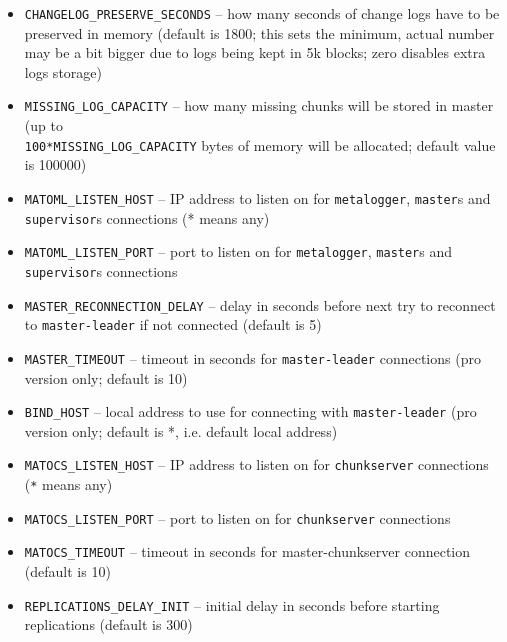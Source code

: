 \documentclass[a4paper,11pt,english]{report}
\def\code#1{\texttt{#1}}
\begin{document}
\begin{itemize}
					\item \code{CHANGELOG\_PRESERVE\_SECONDS}
						-- how many seconds of change logs have to be preserved  in  memory
						(default  is 1800; this sets the minimum, actual number may be a
						bit bigger due to logs being kept in 5k  blocks;  zero  disables
						extra logs storage)
						
					\item \code{MISSING\_LOG\_CAPACITY}
						-- how many missing chunks will be stored in master (up to \\ \code{100*MISSING\_LOG\_CAPACITY} bytes of memory will be allocated; default value is 100000)

					\item \code{MATOML\_LISTEN\_HOST}
						-- IP  address to listen on for \code{metalogger}, \code{master}s and \code{supervisor}s connections (* means any)

					\item \code{MATOML\_LISTEN\_PORT}
						-- port to listen on for \code{metalogger}, \code{master}s and  \code{supervisor}s  connections

					\item \code{MASTER\_RECONNECTION\_DELAY}
						-- delay in  seconds before next try to reconnect to \code{master-leader}
						if not connected (default is 5)

					\item \code{MASTER\_TIMEOUT}
						-- timeout in seconds for \code{master-leader} connections (pro version only; default is 10)

					\item \code{BIND\_HOST}
						-- local address to use for connecting with \code{master-leader} (pro version only; default is *, i.e. default local address)

					\item \code{MATOCS\_LISTEN\_HOST}
						-- IP  address  to  listen  on for \code{chunkserver} connections (\code{*} means any)

					\item \code{MATOCS\_LISTEN\_PORT}
						-- port to listen on for \code{chunkserver} connections
						
					\item \code{MATOCS\_TIMEOUT}
						-- timeout in seconds for master-chunkserver connection (default is 10)

					\item \code{REPLICATIONS\_DELAY\_INIT}
						-- initial delay in seconds before starting  replications  (default is 300)


\end{itemize}
\end{document}
